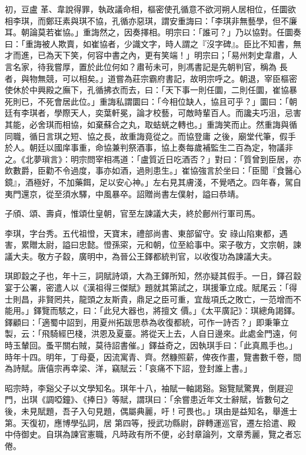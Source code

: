 \begin{pinyinscope}
 初，豆盧
 革、韋說得罪，執政議命相，樞密使孔循意不欲河朔人居相位，任圜欲相李琪，而鄭玨素與琪不協，孔循亦惡琪，謂安重誨曰：「李琪非無藝學，但不廉耳。朝論莫若崔協。」重誨然之，因奏擇相。明宗曰：「誰可？」乃以協對。任圜奏曰：「重誨被人欺賣，如崔協者，少識文字，時人謂之『沒字碑』。臣比不知書，無才而進，已為天下笑，何容中書之內，更有笑端！」明宗曰；「易州刺史韋肅，人言名家，待我嘗厚，置於此位何如？肅茍未可，則馮書記是先朝判官，稱為
 長者，與物無競，可以相矣。」道嘗為莊宗霸府書記，故明宗呼之。朝退，宰臣樞密使休於中興殿之廡下，孔循拂衣而去，曰：「天下事一則任圜，二則任圜，崔協暴死則已，不死會居此位。」重誨私謂圜曰：「今相位缺人，協且可乎？」圜曰：「朝廷有李琪者，學際天人，奕葉軒冕，論才校藝，可敵時輩百人。而讒夫巧沮，忌害其能，必舍琪而相協，如棄蘇合之丸，取蛣蜣之轉也。」重誨笑而止。然重誨與循同職，循日言琪之短、協之長，故重誨竟從之。而協登庸
 之後，廟堂代筆，假手於人。朝廷以國庠事重，命協兼判祭酒事，協上奏每歲補監生二百為定，物議非之。《北夢瑣言》：明宗問宰相馮道：「盧質近日吃酒否？」對曰：「質曾到臣居，亦飲數爵，臣勸不令過度，事亦如酒，過則患生。」崔協強言於坐曰：「臣聞『食醫心鏡』，酒極好，不加藥餌，足以安心神。」左右見其膚淺，不覺哂之。四年春，駕自夷門還京，從至須水驛，中風暴卒。詔贈尚書左僕射，謚曰恭靖。



 子頎、頌、壽貞，惟頌仕皇朝，官至左諫議大夫，終於鄜州行軍司馬。



 李琪，字台秀。五代祖憕，天寶末，禮部尚書、東部留守。安
 祿山陷東都，遇害，累贈太尉，謚曰忠懿。憕孫寀，元和朝，位至給事中。寀子敬方，文宗朝，諫議大夫。敬方子縠，廣明中，為晉公王鐸都統判官，以收復功為諫議大夫。



 琪即縠之子也，年十三，詞賦詩頌，大為王鐸所知，然亦疑其假手。一日，鐸召縠宴于公署，密遣人以《漢祖得三傑賦》題就其第試之，琪援筆立成。賦尾云：「得士則昌，非賢罔共，龍頭之友斯貴，鼎足之臣可重，宜哉項氏之敗亡，一范增而不能用。」鐸覽而駭之，曰：「此兒大器也，將擅文
 價。」《太平廣記》：琪總角謁鐸。鐸顧曰：「適蜀中詔到，用夏州拓跋思恭為收復都統，可作一詩否？」即秉筆立製，云：「飛騎經巴棧，洪恩及夏臺。將從天上去，人自日邊來。此處金門遠，何時玉輦回。蚤平關右賊，莫待詔書催。」鐸益奇之，因執琪手曰：「此真鳳手也。」時年十四。明年，丁母憂，因流寓青、齊。然糠照薪，俾夜作畫，覽書數千卷，間為詩賦。唐僖宗再幸梁、洋，竊賦云：「哀痛不下詔，登封誰上書。」



 昭宗時，李谿父子以文學知名。琪年十八，袖賦一軸謁谿。谿覽賦驚異，倒屣迎門，出琪《調啞鐘》、《捧日》等賦，謂琪曰：「余嘗患近年文士辭賦，皆數句之後，未見賦題，吾子入句見題，偶屬典麗，吁！可畏也。」琪由是益知名，舉進士第。天復初，應博學弘詞，居
 第四等，授武功縣尉，辟轉運巡官，遷左拾遣、殿中侍御史。自琪為諫官憲職，凡時政有所不便，必封章論列，文章秀麗，覽之者忘倦。




\end{pinyinscope}
